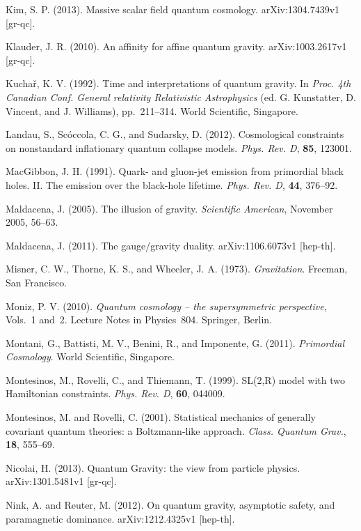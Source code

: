 \documentclass[12pt,a4paper]{article}
\begin{document}
\bibitem{} Kim, S. P. (2013). Massive scalar field quantum cosmology.
         arXiv:1304.7439v1 [gr-qc].

\bibitem{} Klauder, J. R. (2010). An affinity for affine quantum
gravity. arXiv:1003.2617v1 [gr-qc].

\bibitem{} Kucha\v{r}, K. V. (1992). Time and interpretations of quantum
           gravity. In {\em Proc. 4th Canadian Conf.
           General relativity Relativistic Astrophysics}
           (ed. G. Kunstatter, D. Vincent, and J. Williams), pp.~211--314.
           World Scientific, Singapore. 

\bibitem{} Landau, S., Sc\'occola, C. G., and Sudarsky, D. (2012).
Cosmological constraints on nonstandard inflationary quantum collapse
models. {\em Phys. Rev. D}, {\bf 85}, 123001.

\bibitem{} MacGibbon, J. H. (1991). Quark- and
gluon-jet emission from primordial black holes. II. The emission over
the black-hole lifetime. {\em Phys. Rev. D}, {\bf 44}, 376--92.

\bibitem{} Maldacena, J. (2005). The illusion of gravity.
         {\em Scientific American}, November 2005, 56--63.

\bibitem{} Maldacena, J. (2011). The gauge/gravity duality.
           arXiv:1106.6073v1 [hep-th].

\bibitem{} Misner, C. W., Thorne, K. S., and Wheeler, J. A. (1973).
           {\em Gravitation}. Freeman, San Francisco.

\bibitem{} Moniz, P. V. (2010). {\em Quantum cosmology -- the
supersymmetric perspective}, Vols.~1 and~2. Lecture Notes in
Physics~804. Springer, Berlin.

\bibitem{} Montani, G., Battisti, M. V., Benini, R., and Imponente,
  G. (2011). {\em Primordial Cosmology}. World Scientific, Singapore.

\bibitem{} Montesinos, M., Rovelli, C., and Thiemann, T. (1999). 
SL(2,R) model with two Hamiltonian constraints. {\em Phys. Rev. D},
{\bf 60}, 044009.

\bibitem{} Montesinos, M. and Rovelli, C. (2001). Statistical
  mechanics of generally covariant quantum theories: a Boltzmann-like
  approach. {\em Class. Quantum Grav.}, {\bf 18}, 555--69.

\bibitem{} Nicolai, H. (2013). Quantum Gravity: the view from particle
           physics. arXiv:1301.5481v1 [gr-qc].

\bibitem{} Nink, A. and Reuter, M. (2012). On quantum gravity,
  asymptotic safety, and paramagnetic dominance. arXiv:1212.4325v1 [hep-th].
\end{document}
